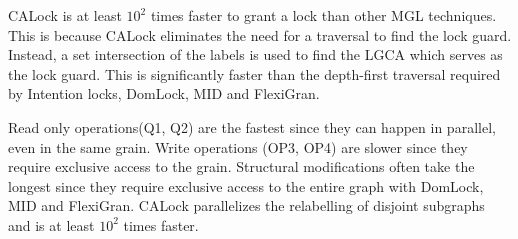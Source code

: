 CALock is at least $10^2$ times faster to grant a lock than other MGL techniques. This is because CALock eliminates the need for a traversal to find the lock guard. Instead, a set intersection of the labels is used to find the LGCA which serves as the lock guard. This is significantly faster than the depth-first traversal required by Intention locks, DomLock, MID and FlexiGran.

Read only operations(Q1, Q2) are the fastest since they can happen in parallel, even in the same grain. 
Write operations (OP3, OP4) are slower since they require exclusive access to the grain. Structural modifications often take the longest since they require exclusive access to the entire graph with DomLock, MID and FlexiGran. CALock parallelizes the relabelling of disjoint subgraphs and is at least $10^2$ times faster. 







